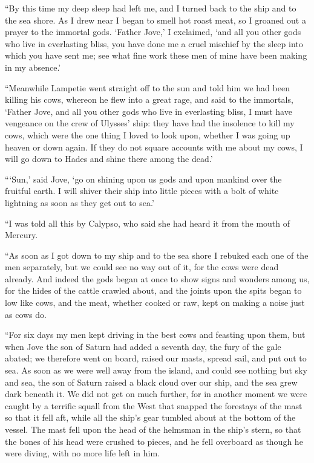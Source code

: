 “By this time my deep sleep had left me, and I turned back to the ship and to
the sea shore. As I drew near I began to smell hot roast meat, so I groaned out
a prayer to the immortal gods. ‘Father Jove,’ I exclaimed, ‘and all you other
gods who live in everlasting bliss, you have done me a cruel mischief by the
sleep into which you have sent me; see what fine work these men of mine have
been making in my absence.’

“Meanwhile Lampetie went straight off to the sun and told him we had been
killing his cows, whereon he flew into a great rage, and said to the immortals,
‘Father Jove, and all you other gods who live in everlasting bliss, I must have
vengeance on the crew of Ulysses’ ship: they have had the insolence to kill my
cows, which were the one thing I loved to look upon, whether I was going up
heaven or down again. If they do not square accounts with me about my cows, I
will go down to Hades and shine there among the dead.’

“‘Sun,’ said Jove, ‘go on shining upon us gods and upon mankind over the
fruitful earth. I will shiver their ship into little pieces with a bolt of
white lightning as soon as they get out to sea.’

“I was told all this by Calypso, who said she had heard it from the mouth of
Mercury.

“As soon as I got down to my ship and to the sea shore I rebuked each one of
the men separately, but we could see no way out of it, for the cows were dead
already. And indeed the gods began at once to show signs and wonders among us,
for the hides of the cattle crawled about, and the joints upon the spits began
to low like cows, and the meat, whether cooked or raw, kept on making a noise
just as cows do.

“For six days my men kept driving in the best cows and feasting upon them, but
when Jove the son of Saturn had added a seventh day, the fury of the gale
abated; we therefore went on board, raised our masts, spread sail, and put out
to sea. As soon as we were well away from the island, and could see nothing but
sky and sea, the son of Saturn raised a black cloud over our ship, and the sea
grew dark beneath it. We did not get on much further, for in another moment we
were caught by a terrific squall from the West that snapped the forestays of
the mast so that it fell aft, while all the ship’s gear tumbled about at the
bottom of the vessel. The mast fell upon the head of the helmsman in the ship’s
stern, so that the bones of his head were crushed to pieces, and he fell
overboard as though he were diving, with no more life left in him.

